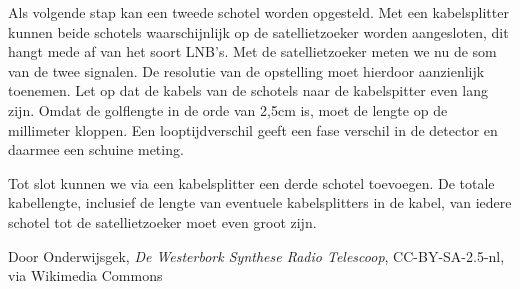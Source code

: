 Als volgende stap kan een tweede schotel worden opgesteld. Met een
kabelsplitter kunnen beide schotels waar\-schijn\-lijk op de satellietzoeker
worden aangesloten, dit hangt mede af van het soort LNB's. Met de
satellietzoeker meten we nu de som van de twee signalen. De resolutie
van de opstelling moet hierdoor aanzienlijk toenemen. Let op dat de
kabels van de schotels naar de kabelspitter even lang zijn. Omdat
de golflengte in de orde van 2,5cm is, moet de lengte op de millimeter
kloppen. Een looptijdverschil geeft een fase verschil in de detector
en daarmee een schuine meting.

Tot slot kunnen we via een kabelsplitter een derde schotel toevoegen.
De totale kabellengte, inclusief de lengte van eventuele kabelsplitters
in de kabel, van iedere schotel tot de satellietzoeker moet even groot
zijn. 

\begin{thebibliography}{9}
        Door Onderwijsgek, \emph{De Westerbork Synthese Radio Telescoop}, CC-BY-SA-2.5-nl, via Wikimedia Commons
\end{thebibliography}


